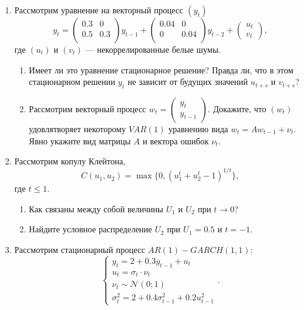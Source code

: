 \documentclass[12pt]{article}
\newcommand \cN{\mathcal{N}}
\begin{document}
\begin{enumerate}
\item Рассмотрим уравнение на векторный процесс $(y_t)$
\[
y_t   =
\begin{pmatrix}
    0.3 & 0 \\
    0.5 & 0.3 \\
\end{pmatrix}
y_{t-1}  +
\begin{pmatrix}
    0.04 & 0 \\
    0 & 0.04 \\
\end{pmatrix}
y_{t-2} +
\begin{pmatrix}
    u_t \\
    v_t
\end{pmatrix},
\]
где $(u_t)$ и $(v_t)$ — некоррелированные белые шумы. 
\begin{enumerate}
    \item Имеет ли это уравнение стационарное решение? Правда ли, что в этом стационарном решении $y_t$ не зависит от будущих значений $u_{t+s}$ и $v_{t+s}$?
    \item Рассмотрим векторный процесс
    $
        w_t = \begin{pmatrix}
            y_t \\
            y_{t-1}
        \end{pmatrix}.
    $
    Докажите, что $(w_t)$ удовлятворяет некоторому $VAR(1)$ уравнению вида 
    $
    w_t = A w_{t-1} + \nu_t.    
    $
    Явно укажите вид матрицы $A$ и вектора ошибок $\nu_t$.
\end{enumerate}

\item Рассмотрим копулу Клейтона, 
\[
C(u_1, u_2) = \max\{0, (u_1^t + u_2^t - 1)^{1/t} \},    
\]
где $t \leq 1$. 
\begin{enumerate}
    \item Как связаны между собой величины $U_1$ и $U_2$ при $t\to 0$?
    \item Найдите условное распределение $U_2$ при $U_1 = 0.5$ и $t = -1$.
\end{enumerate}

\item Рассмотрим стационарный процесс $AR(1)-GARCH(1,1)$:
\[
\begin{cases}
y_t = 2 + 0.3 y_{t-1} + u_t \\
u_t = \sigma_t \cdot \nu_t \\
\nu_t \sim \cN(0;1) \\
\sigma^2_t = 2 + 0.4 \sigma^2_{t-1} + 0.2u_{t-1}^2
\end{cases}.
\]


\end{enumerate}
\end{document}
